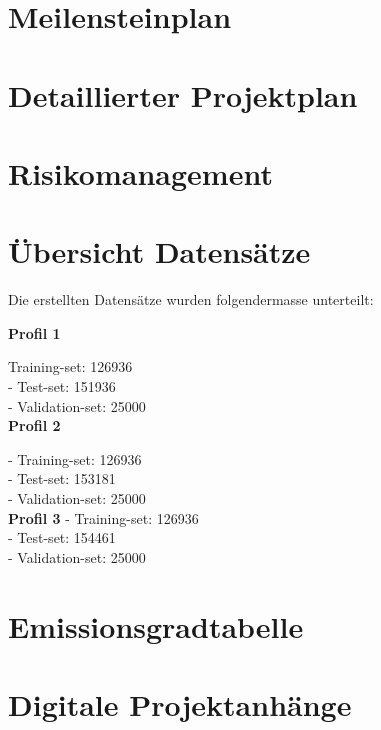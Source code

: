 \appendix

\chapter{Meilensteinplan}
\label{AnhangA}

\chapter{Detaillierter Projektplan}
\label{AnhangB}

\chapter{Risikomanagement}
\label{AnhangC}

\chapter{Übersicht Datensätze }
\label{AnhangD}

Die erstellten Datensätze wurden folgendermasse unterteilt:


\textbf{Profil 1}

Training-set:         126936 \\
- Test-set:             151936 \\
- Validation-set:       25000 \\


\textbf{Profil 2}

- Training-set:         126936 \\
- Test-set:             153181 \\
- Validation-set:       25000 \\

\textbf{Profil 3}
- Training-set:         126936 \\
- Test-set:             154461 \\ 
- Validation-set:       25000 \\


\chapter{Emissionsgradtabelle}
\label{AnhangE}





\chapter{Digitale Projektanhänge}
\label{AnhangDig}

